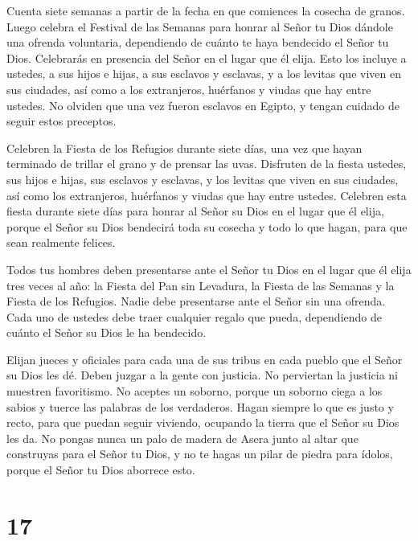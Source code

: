  Cuenta siete semanas a partir de la fecha en que comiences
la cosecha de granos.  Luego celebra el Festival de las
Semanas para honrar al Señor tu Dios dándole una ofrenda voluntaria,
dependiendo de cuánto te haya bendecido el Señor tu Dios. 
Celebrarás en presencia del Señor en el lugar que él elija. Esto los
incluye a ustedes, a sus hijos e hijas, a sus esclavos y esclavas, y a
los levitas que viven en sus ciudades, así como a los extranjeros,
huérfanos y viudas que hay entre ustedes.  No olviden que
una vez fueron esclavos en Egipto, y tengan cuidado de seguir estos
preceptos.

 Celebren la Fiesta de los Refugios durante siete días, una
vez que hayan terminado de trillar el grano y de prensar las uvas.
 Disfruten de la fiesta ustedes, sus hijos e hijas, sus
esclavos y esclavas, y los levitas que viven en sus ciudades, así como
los extranjeros, huérfanos y viudas que hay entre ustedes. 
Celebren esta fiesta durante siete días para honrar al Señor su Dios en
el lugar que él elija, porque el Señor su Dios bendecirá toda su cosecha
y todo lo que hagan, para que sean realmente felices.

 Todos tus hombres deben presentarse ante el Señor tu Dios
en el lugar que él elija tres veces al año: la Fiesta del Pan sin
Levadura, la Fiesta de las Semanas y la Fiesta de los Refugios. Nadie
debe presentarse ante el Señor sin una ofrenda.  Cada uno
de ustedes debe traer cualquier regalo que pueda, dependiendo de cuánto
el Señor su Dios le ha bendecido.

 Elijan jueces y oficiales para cada una de sus tribus en
cada pueblo que el Señor su Dios les dé. Deben juzgar a la gente con
justicia.  No perviertan la justicia ni muestren
favoritismo. No aceptes un soborno, porque un soborno ciega a los sabios
y tuerce las palabras de los verdaderos.  Hagan siempre lo
que es justo y recto, para que puedan seguir viviendo, ocupando la
tierra que el Señor su Dios les da.  No pongas nunca un
palo de madera de Asera junto al altar que construyas para el Señor tu
Dios,  y no te hagas un pilar de piedra para ídolos, porque
el Señor tu Dios aborrece esto.

\hypertarget{section-16}{%
\section{17}\label{section-16}}


